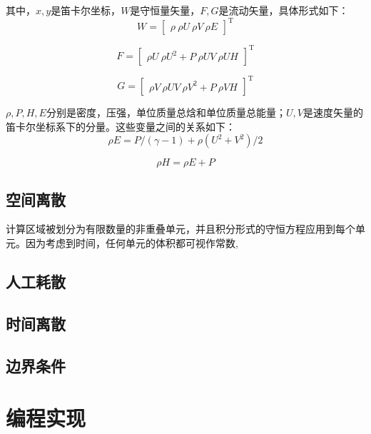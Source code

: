 \documentclass[UTF8]{ctexart}
\begin{document}
\indent 其中，$x,y$是笛卡尔坐标，$W$是守恒量矢量，$F,G$是流动矢量，具体形式如下：
\begin{equation}
W={\begin{bmatrix} \rho \ \rho U \ \rho V \ \rho E \end{bmatrix}}^\mathrm{T}
\end{equation}

\begin{equation}
F={\begin{bmatrix} \rho U \ \rho U^2 + P \ \rho UV \ \rho UH \end{bmatrix}}^\mathrm{T}
\end{equation}

\begin{equation}
G={\begin{bmatrix} \rho V \ \rho UV \ \rho V^2 + P \ \rho VH \end{bmatrix}}^\mathrm{T}
\end{equation}

\indent $\rho,P,H,E$分别是密度，压强，单位质量总焓和单位质量总能量；$U,V$是速度矢量的笛卡尔坐标系下的分量。这些变量之间的关系如下：
\begin{equation}
\rho E=P/(\gamma-1)+\rho (U^2+V^2)/2
\end{equation}

\begin{equation}
\rho H=\rho E + P
\end{equation}

\subsection{空间离散}
计算区域被划分为有限数量的非重叠单元，并且积分形式的守恒方程应用到每个单元。因为考虑到时间，任何单元的体积都可视作常数,

\subsection{人工耗散}

\subsection{时间离散}

\subsection{边界条件}

\section{编程实现}
\end{document}

